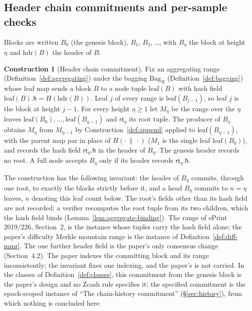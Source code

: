 \documentclass[11pt,a4paper]{article}
\theoremstyle{definition}
\newtheorem{construction}[theorem]{Construction}
\begin{document}
\subsection{Header chain commitments and per-sample checks}
\label{sec:protocol-commit}

Blocks are written $B_0$ (the genesis block), $B_1$, $B_2$, \ldots, with
$B_\eta$ the block at height $\eta$ and $\mathrm{hdr}(B)$ the header of $B$.

\begin{construction}[Header chain commitment]\label{def:chain-commitment}
Fix an aggregating range (Definition~\ref{def:aggregating}) under the
bagging $\mathrm{Bag}_R$ (Definition~\ref{def:bagging}) whose leaf map sends
a block $B$ to a node tuple $\mathrm{leaf}(B)$ with hash field
$\mathrm{leaf}(B).\mathsf{h}=H(\mathrm{hdr}(B))$. Leaf $j$ of every range is
$\mathrm{leaf}(B_{j-1})$, so leaf $j$ is the block at height $j-1$. For every
height $\eta\ge 1$ let $M_\eta$ be the range over the $\eta$ leaves
$\mathrm{leaf}(B_0),\dots,\mathrm{leaf}(B_{\eta-1})$ and $\mathsf{rt}_\eta$
its root tuple. The producer of $B_\eta$ obtains $M_\eta$ from $M_{\eta-1}$
by Construction~\ref{def:append} applied to $\mathrm{leaf}(B_{\eta-1})$, with
the parent map $\mathrm{par}$ in place of $H(\cdot\,\|\,\cdot)$ ($M_1$ is the
single leaf $\mathrm{leaf}(B_0)$), and records the hash field
$\mathsf{rt}_\eta.\mathsf{h}$ in the header of $B_\eta$. The genesis header
records no root. A full node accepts $B_\eta$ only if its header records
$\mathsf{rt}_\eta.\mathsf{h}$.
\end{construction}

The construction has the following invariant: the header of $B_\eta$
commits, through one root, to exactly the blocks strictly before it, and a
head $B_\eta$ commits to $n=\eta$ leaves, $n$ denoting this leaf count
below. The root's fields other than its hash
field are not recorded; a verifier recomputes the root tuple from its two
children, which the hash field binds (Lemma~\ref{lem:aggregate-binding}).
The range of ePrint 2019/226, Section~2, is the instance whose tuples carry
the hash field alone; the paper's difficulty Merkle mountain range is the
instance of Definition~\ref{def:diff-mmr}. The one further header field is
the paper's only consensus change (Section~4.2). The paper indexes the
committing block and its range inconsistently; the invariant fixes one
indexing, and the paper's is not carried. In the classes of
Definition~\ref{def:classes}, this commitment from the genesis block is the
paper's design and no Zcash rule specifies it; the specified commitment is
the epoch-scoped instance of ``The chain-history commitment''
(\S\ref{sec:history}), from which nothing is concluded here.
\end{document}
